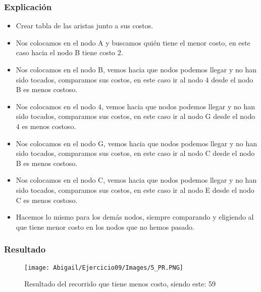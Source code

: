 \documentclass[12pt]{article}
\begin{document}
    
        \subsubsection{Explicación}
            \begin{itemize}
    
              \item[\checkmark] Crear tabla de las aristas junto a sus costos.
    
              \item[\checkmark] Nos colocamos en el nodo A y buscamos quién tiene el menor costo, en este caso hacia el nodo B tiene costo $2$.
              
              \item[\checkmark] Nos colocamos en el nodo B, vemos hacia que nodos podemos llegar y no han sido tocados, comparamos sus costos, en este caso ir al nodo $4$ desde el nodo B es menos costoso.
            
              \item[\checkmark] Nos colocamos en el nodo $4$, vemos hacia que nodos podemos llegar y no han sido tocados, comparamos sus costos, en este caso ir al nodo G desde el nodo $4$ es menos costoso.
              
              \item[\checkmark] Nos colocamos en el nodo G, vemos hacia que nodos podemos llegar y no han sido tocados, comparamos sus costos, en este caso ir al nodo C desde el nodo B es menos costoso.
              
               \item[\checkmark] Nos colocamos en el nodo C, vemos hacia que nodos podemos llegar y no han sido tocados, comparamos sus costos, en este caso ir al nodo E desde el nodo C es menos costoso.
              
              \item[\checkmark] Hacemos lo mismo para los demás nodos, siempre comparando y eligiendo al que tiene menor costo en los nodos que no hemos pasado.
    
            \end{itemize}
                
      \subsubsection{Resultado}
        \begin{figure}[h!]
          \centering
          \texttt{[image: Abigail/Ejercicio09/Images/5\_PR.PNG]}
          \caption{Resultado del recorrido que tiene menos costo, siendo este: 59}
        \end{figure} 
    
\end{document}
